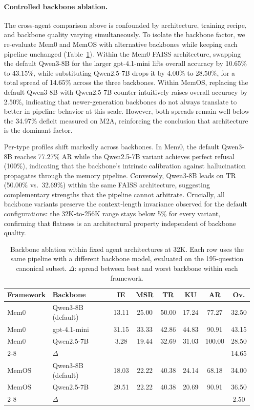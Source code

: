 \documentclass{llmxive}
\begin{document}
\paragraph{Controlled backbone ablation.}
The cross-agent comparison above is confounded by architecture, training recipe, and backbone quality varying simultaneously. To isolate the backbone factor, we re-evaluate Mem0 and MemOS with alternative backbones while keeping each pipeline unchanged (Table~\ref{tab:backbone_ablation}). Within the Mem0 FAISS architecture, swapping the default Qwen3-8B for the larger gpt-4.1-mini lifts overall accuracy by 10.65\% to 43.15\%, while substituting Qwen2.5-7B drops it by 4.00\% to 28.50\%, for a total spread of 14.65\% across the three backbones. Within MemOS, replacing the default Qwen3-8B with Qwen2.5-7B counter-intuitively raises overall accuracy by 2.50\%, indicating that newer-generation backbones do not always translate to better in-pipeline behavior at this scale. However, both spreads remain well below the 34.97\% deficit measured on M2A, reinforcing the conclusion that architecture is the dominant factor.

Per-type profiles shift markedly across backbones. In Mem0, the default Qwen3-8B reaches 77.27\% AR while the Qwen2.5-7B variant achieves perfect refusal (100\%), indicating that the backbone's intrinsic calibration against hallucination propagates through the memory pipeline. Conversely, Qwen3-8B leads on TR (50.00\% vs.\ 32.69\%) within the same FAISS architecture, suggesting complementary strengths that the pipeline cannot arbitrate. Crucially, all backbone variants preserve the context-length invariance observed for the default configurations: the 32K-to-256K range stays below 5\% for every variant, confirming that flatness is an architectural property independent of backbone quality.

\begin{table}[!htbp]
\centering
\small
\begin{tabular}{@{}llcccccc@{}}
\toprule
Framework & Backbone & IE & MSR & TR & KU & AR & Ov. \\
\midrule
Mem0 & Qwen3-8B (default) & 13.11 & 25.00 & 50.00 & 17.24 & 77.27 & 32.50 \\
Mem0 & gpt-4.1-mini & 31.15 & 33.33 & 42.86 & 44.83 & 90.91 & 43.15 \\
Mem0 & Qwen2.5-7B & 3.28 & 19.44 & 32.69 & 31.03 & 100.00 & 28.50 \\
\cmidrule{2-8}
& $\Delta$ & & & & & & 14.65 \\
\midrule
MemOS & Qwen3-8B (default) & 18.03 & 22.22 & 40.38 & 24.14 & 68.18 & 34.00 \\
MemOS & Qwen2.5-7B & 29.51 & 22.22 & 40.38 & 20.69 & 90.91 & 36.50 \\
\cmidrule{2-8}
& $\Delta$ & & & & & & 2.50 \\
\bottomrule
\end{tabular}
\caption{Backbone ablation within fixed agent architectures at 32K.
Each row uses the same pipeline with a different backbone model,
evaluated on the 195-question canonical subset.
$\Delta$: spread between best and worst backbone within each framework.}
\label{tab:backbone_ablation}
\end{table}
\end{document}
